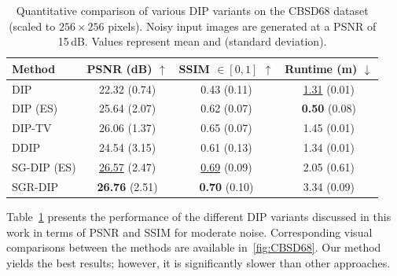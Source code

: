 \begin{table}
    \small
    \centering
    \begin{tabular}{ l c c c }
        \toprule
        Method &PSNR (dB) $\uparrow$ &SSIM $\in [0,1]$ $\uparrow$ &Runtime (m) $\downarrow$\\
        \midrule
        DIP &22.32 {\scriptsize (0.74)} &0.43 {\scriptsize (0.11)} &\underline{1.31} {\scriptsize (0.01)} \\
        DIP (ES) &25.64 {\scriptsize (2.07)} &0.62 {\scriptsize (0.07)} &\textbf{0.50} {\scriptsize (0.08)} \\
        DIP-TV &26.06 {\scriptsize (1.37)} &0.65 {\scriptsize (0.07)} &1.45 {\scriptsize (0.01)} \\
        DDIP &24.54 {\scriptsize (3.15)} &0.61 {\scriptsize (0.13)} &1.34 {\scriptsize (0.01)} \\
        SG-DIP (ES) &\underline{26.57} {\scriptsize (2.47)} &\underline{0.69} {\scriptsize (0.09)} &2.05 {\scriptsize (0.61)} \\
        SGR-DIP &\textbf{26.76} {\scriptsize (2.51)} &\textbf{0.70} {\scriptsize (0.10)} &3.34 {\scriptsize (0.09)} \\
        \bottomrule
    \end{tabular}
    \caption{
        Quantitative comparison of various DIP variants on the CBSD68 dataset (scaled to $256 \times 256$ pixels).
        Noisy input images are generated at a PSNR of 15\,dB.
        Values represent mean and {\scriptsize (standard deviation)}.
    }\label{tab:CBSD68}
\end{table}

Table~\ref{tab:CBSD68} presents the performance of the different DIP variants discussed in this work in terms of PSNR and SSIM for moderate noise.
Corresponding visual comparisons between the methods are available in~\ref{fig:CBSD68}.
Our method yields the best results; however, it is significantly slower than other approaches.

